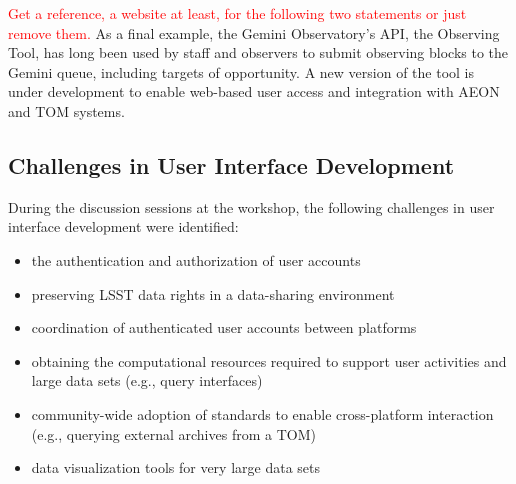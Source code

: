 \textcolor{red}{Get a reference, a website at least, for the following two statements or just remove them.}
As a final example, the Gemini Observatory's API, the Observing Tool, has long been used by staff and observers to submit observing blocks to the Gemini queue, including targets of opportunity.
A new version of the tool is under development to enable web-based user access and integration with AEON and TOM systems.

\subsection{Challenges in User Interface Development}\label{ssec:interfaces_challenges}

During the discussion sessions at the workshop, the following challenges in user interface development were identified:
\begin{itemize}
\item the authentication and authorization of user accounts
\item preserving LSST data rights in a data-sharing environment 
\item coordination of authenticated user accounts between platforms
\item obtaining the computational resources required to support user activities and large data sets (e.g., query interfaces)
\item community-wide adoption of standards to enable cross-platform interaction (e.g., querying external archives from a TOM)
\item data visualization tools for very large data sets
\end{itemize}


